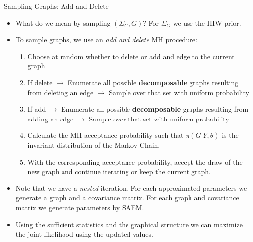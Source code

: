 \begin{frame}{Sampling Graphs: Add and Delete}
    \begin{itemize}
        \item What do we mean by sampling $(\Sigma_G, G)$? For $\Sigma_G$ we use the HIW prior.
        \item To sample graphs, we use an \textit{add and delete} MH procedure:
        \begin{enumerate}
            \item Choose at random whether to delete or add and edge to the current graph
            \item If delete $\rightarrow$ Enumerate all possible \textbf{decomposable} graphs resulting from deleting an edge $\rightarrow$ Sample over that set with uniform probability
            \item If add $\rightarrow$ Enumerate all possible \textbf{decomposable} graphs resulting from adding an edge $\rightarrow$ Sample over that set with uniform probability
            \item Calculate the MH acceptance probability such that $\pi(G|Y,\theta)$ is the invariant distribution of the Markov Chain.
            \item With the corresponding acceptance probability, accept the draw of the new graph and continue iterating or keep the current graph.
        \end{enumerate}
        \item Note that we have a \textit{nested} iteration. For each approximated parameters we generate a graph and a covariance matrix. For each graph and covariance matrix we generate parameters by SAEM.
        \item Using the sufficient statistics and the graphical structure we can maximize the joint-likelihood using the updated values.
    \end{itemize}
\end{frame}


